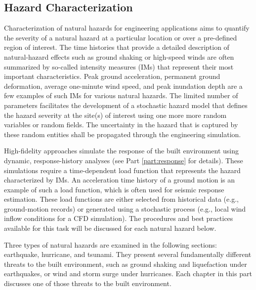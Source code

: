 
\begin{partbacktext}
\part{Hazard Characterization}
\label{part:hazard}

Characterization of natural hazards for engineering applications aims to quantify the severity of a natural hazard at a particular location or over a pre-defined region of interest. The time histories that provide a detailed description of natural-hazard effects such as ground shaking or high-speed winds are often summarized by so-called intensity measures (IMs) that represent their most important characteristics. Peak ground acceleration, permanent ground deformation, average one-minute wind speed, and peak inundation depth are a few examples of such IMs for various natural hazards. The limited number of parameters facilitates the development of a stochastic hazard model that defines the hazard severity at the site(s) of interest using one more more random variables or random fields. The uncertainty in the hazard that is captured by these random entities shall be propagated through the engineering simulation. 

High-fidelity approaches simulate the response of the built environment using dynamic, response-history analyses (see Part \ref{part:response} for details). These simulations require a time-dependent load function that represents the hazard characterized by IMs. An acceleration time history of a ground motion is an example of such a load function, which is often used for seismic response estimation. These load functions are either selected from historical data (e.g., ground-motion records) or generated using a stochastic process (e.g., local wind inflow conditions for a CFD simulation). The procedures and best practices available for this task will be discussed for each natural hazard below.

Three types of natural hazards are examined in the following sections: earthquake, hurricane, and tsunami. They present several fundamentally different threats to the built environment, such as ground shaking and liquefaction under earthquakes, or wind and storm surge under hurricanes. Each chapter in this part discusses one of those threats to the built environment.

\end{partbacktext}